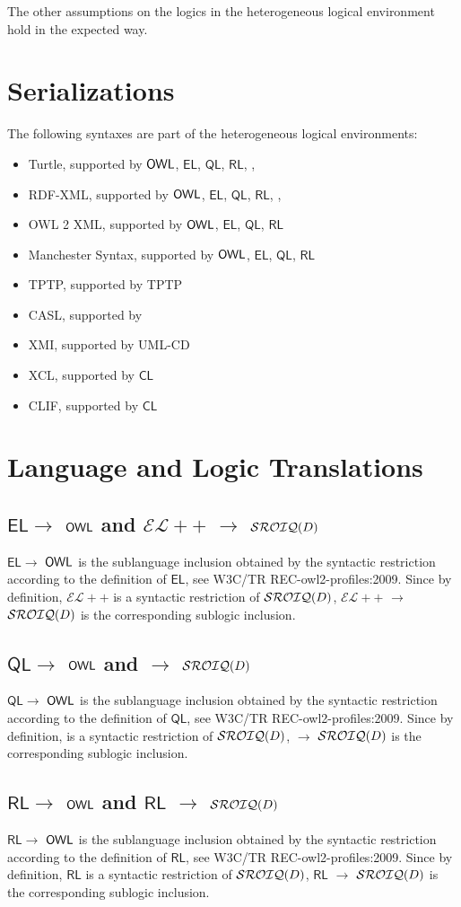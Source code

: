 \documentclass[10pt,fleqn,final]{scrreprt}
\newcommand*{\CL}{\ensuremath{\mathsf{CL}}\xspace}
\newcommand{\QL}{\ensuremath{\mathsf{QL}}\xspace}
\newcommand{\RL}{\ensuremath{\mathsf{RL}}\xspace}
\newcommand{\EL}{\ensuremath{\mathsf{EL}}\xspace}
\newcommand{\ELDL}{\ensuremath{\mathcal{EL}}\xspace}
\newcommand{\sclause}[1]{\section{#1}}
\newcommand{\ssclause}[1]{\subsection{#1}}
\newcommand{\nisref}[1]{#1}
\newenvironment{definitions}[0]{\medskip }{}
\begin{document}
\begin{definitions}
The other assumptions on the logics in the heterogeneous logical environment hold in
the expected way.

\sclause{Serializations}

The following syntaxes are part of the heterogeneous logical environments:
\begin{itemize}
 \item Turtle, supported by $\mathsf{OWL}$, \EL, \QL, \RL , \RDF, \RDFS
 \item RDF-XML, supported by $\mathsf{OWL}$, \EL, \QL, \RL , \RDF, \RDFS
 \item OWL 2 XML, supported by $\mathsf{OWL}$, \EL, \QL, \RL 
 \item Manchester Syntax, supported by $\mathsf{OWL}$, \EL, \QL, \RL
  \item TPTP, supported by TPTP
  \item CASL, supported by \CASL
 \item XMI, supported by UML-CD
 \item XCL, supported by \CL
 \item CLIF, supported by \CL 
\end{itemize}

\sclause{Language and Logic Translations}

\ssclause{\EL $\to$ $\mathsf{OWL}$ and $\ELDL++$ $\to$ $\mathcal{SROIQ}(D)$}

\EL $\to$ $\mathsf{OWL}$ is the sublanguage inclusion obtained by the
syntactic restriction according to the definition of \EL, see
\nisref{W3C/TR REC-owl2-profiles:2009}. Since by definition, $\ELDL++$
is a syntactic restriction of $\mathcal{SROIQ}(D)$, $\ELDL++$ $\to$ $\mathcal{SROIQ}(D)$
is the corresponding sublogic inclusion.

\ssclause{\QL $\to$ $\mathsf{OWL}$ and \DLLiteR $\to$ $\mathcal{SROIQ}(D)$}

\QL $\to$ $\mathsf{OWL}$ is the sublanguage inclusion obtained by the
syntactic restriction according to the definition of \QL, see
\nisref{W3C/TR REC-owl2-profiles:2009}. Since by definition, \DLLiteR
is a syntactic restriction of $\mathcal{SROIQ}(D)$, \DLLiteR $\to$ $\mathcal{SROIQ}(D)$
is the corresponding sublogic inclusion.

\ssclause{\RL $\to$ $\mathsf{OWL}$ and $\RL$ $\to$ $\mathcal{SROIQ}(D)$}

\RL $\to$ $\mathsf{OWL}$ is the sublanguage inclusion obtained by the
syntactic restriction according to the definition of \RL, see
\nisref{W3C/TR REC-owl2-profiles:2009}. Since by definition, $\RL$
is a syntactic restriction of $\mathcal{SROIQ}(D)$, $\RL$ $\to$ $\mathcal{SROIQ}(D)$
is the corresponding sublogic inclusion.


\end{definitions}
\end{document}
